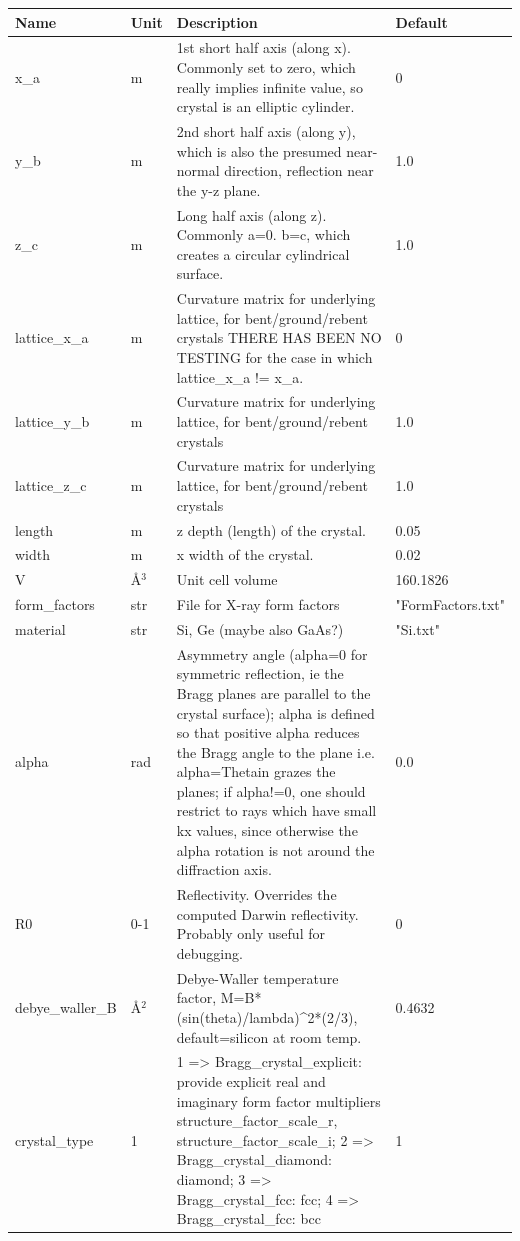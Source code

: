 \begin{longtable}{p{}p{}p{}p{}}
\toprule
\textbf{Name} & \textbf{Unit} & \textbf{Description} & \textbf{Default} \\
\midrule
\endhead
x\_a & m & 1st short half axis (along x). Commonly set to zero, which really implies infinite value, so crystal is an elliptic cylinder. & 0 \\
y\_b & m & 2nd short half axis (along y), which is also the presumed near-normal direction, reflection near the y-z plane. & 1.0 \\
z\_c & m & Long  half axis (along z). Commonly a=0. b=c, which creates a circular cylindrical surface. & 1.0 \\
lattice\_x\_a & m & Curvature matrix for underlying lattice, for bent/ground/rebent crystals THERE HAS BEEN NO TESTING for the case in which lattice\_x\_a != x\_a. & 0 \\
lattice\_y\_b & m & Curvature matrix for underlying lattice, for bent/ground/rebent crystals & 1.0 \\
lattice\_z\_c & m & Curvature matrix for underlying lattice, for bent/ground/rebent crystals & 1.0 \\
length & m & z depth (length) of the crystal. & 0.05 \\
width & m & x width of the crystal. & 0.02 \\
V & \AA{}$^{3}$ & Unit cell volume & 160.1826 \\
form\_factors & str & File for X-ray form factors & "FormFactors.txt" \\
material & str & Si, Ge (maybe also GaAs?) & "Si.txt" \\
alpha & rad & Asymmetry angle (alpha=0 for symmetric reflection, ie the Bragg planes are parallel to the crystal surface); alpha is defined so that positive alpha reduces the Bragg angle to the plane i.e. alpha=Thetain grazes the planes; if alpha!=0,  one should restrict to rays which have small kx values, since otherwise the alpha rotation is not around the diffraction axis. & 0.0 \\
R0 & 0-1 & Reflectivity. Overrides the computed Darwin reflectivity. Probably only useful for debugging. & 0 \\
debye\_waller\_B & \AA{}$^{2}$ & Debye-Waller temperature factor, M=B*(sin(theta)/lambda)\textasciicircum{}2*(2/3), default=silicon at room temp. & 0.4632 \\
crystal\_type & 1 & 1 =\textgreater{} Bragg\_crystal\_explicit: provide explicit real and imaginary form factor multipliers structure\_factor\_scale\_r, structure\_factor\_scale\_i; 2 =\textgreater{} Bragg\_crystal\_diamond: diamond; 3 =\textgreater{} Bragg\_crystal\_fcc: fcc; 4 =\textgreater{} Bragg\_crystal\_fcc: bcc & 1 \\

\end{longtable}
